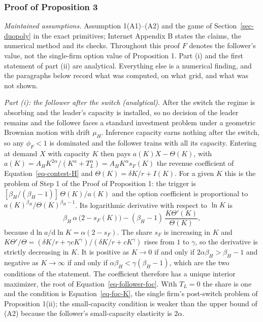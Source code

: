 \documentclass[
  11pt,
  letterpaper,
]{scrartcl}
\begin{document}
\subsubsection*{Proof of Proposition 3}\label{proof-of-proposition-3}

\emph{Maintained assumptions.} Assumption 1(A1)--(A2) and the game of
Section~\ref{sec-duopoly} in the exact primitives; Internet Appendix B
states the claims, the numerical method and its checks. Throughout this
proof \(F\) denotes the follower's value, not the single-firm option
value of Proposition 1. Part (i) and the first statement of part (ii)
are analytical. Everything else is a numerical finding, and the
paragraphs below record what was computed, on what grid, and what was
not shown.

\emph{Part (i): the follower after the switch (analytical).} After the
switch the regime is absorbing and the leader's capacity is installed,
so no decision of the leader remains and the follower faces a standard
investment problem under a geometric Brownian motion with drift
\(\mu_H\). Inference capacity earns nothing after the switch, so any
\(\phi_F < 1\) is dominated and the follower trains with all its
capacity. Entering at demand \(X\) with capacity \(K\) then pays
\(a(K)X - \Theta(K)\), with
\(a(K) = A_H K^{2\alpha}/(K^\alpha + T_L^\alpha) = A_H K^\alpha s_F(K)\)
the revenue coefficient of Equation~\ref{eq-contest-H} and
\(\Theta(K) = \delta K/r + I(K)\). For a given \(K\) this is the problem
of Step 1 of the Proof of Proposition 1: the trigger is
\([\beta_H/(\beta_H-1)]\,\Theta(K)/a(K)\) and the option coefficient is
proportional to \(a(K)^{\beta_H}/\Theta(K)^{\beta_H - 1}\). Its
logarithmic derivative with respect to \(\ln K\) is \[
\beta_H\,\alpha\,\bigl(2 - s_F(K)\bigr) - (\beta_H - 1)\,\frac{K\Theta'(K)}{\Theta(K)},
\] because \(\mathrm{d}\ln a/\mathrm{d}\ln K = \alpha(2 - s_F)\). The
share \(s_F\) is increasing in \(K\) and
\(K\Theta'/\Theta = (\delta K/r + \gamma c K^\gamma)/(\delta K/r + cK^\gamma)\)
rises from \(1\) to \(\gamma\), so the derivative is strictly decreasing
in \(K\). It is positive as \(K \to 0\) if and only if
\(2\alpha\beta_H > \beta_H - 1\) and negative as \(K \to \infty\) if and
only if \(\alpha\beta_H < \gamma(\beta_H - 1)\), which are the two
conditions of the statement. The coefficient therefore has a unique
interior maximizer, the root of Equation~\ref{eq-follower-foc}. With
\(T_L = 0\) the share is one and the condition is
Equation~\ref{eq-foc-K}, the single firm's post-switch problem of
Proposition 1(ii); the small-capacity condition is weaker than the upper
bound of (A2) because the follower's small-capacity elasticity is
\(2\alpha\).
\end{document}
